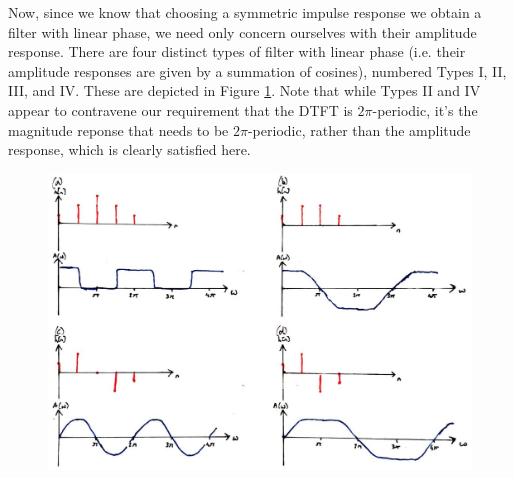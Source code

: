 Now, since we know that choosing a symmetric impulse response we obtain a filter
with linear phase, we need only concern ourselves with their amplitude response.
There are four distinct types of filter with linear phase (i.e. their amplitude
responses are given by a summation of cosines), numbered Types I, II, III, and IV.
These are depicted in Figure \ref{fig::lecture_16_filter_types}.
Note that while Types II and IV appear to
contravene our requirement that the DTFT is $2\pi$-periodic, it's the magnitude
reponse that needs to be $2\pi$-periodic, rather than the amplitude response, which
is clearly satisfied here.\\
%
\begin{figure}[!htb]
  \includegraphics[width=\textwidth]{images/lecture_16_filter_Types.JPG}
  \caption{
  }
  \label{fig::lecture_16_filter_types}
\end{figure}

